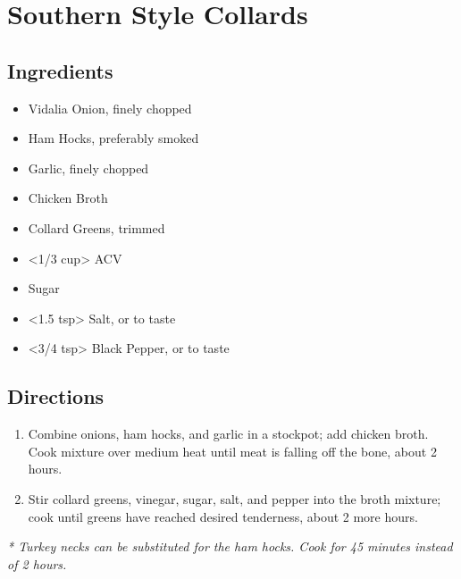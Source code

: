 \section{Southern Style Collards}

\subsection{ Ingredients }

\begin{itemize}
  \item <2 onions> Vidalia Onion, finely chopped
  \item <3 lbs> Ham Hocks, preferably smoked
  \item <4 cloves> Garlic, finely chopped
  \item <32 oz> Chicken Broth
  \item <3 lbs> Collard Greens, trimmed
  \item <1/3 cup> ACV
  \item <2 tbs> Sugar
  \item <1.5 tsp> Salt, or to taste
  \item <3/4 tsp> Black Pepper, or to taste
\end{itemize}

\subsection{ Directions }

\begin{enumerate}
  \item Combine onions, ham hocks, and garlic in a stockpot; add chicken broth. Cook mixture over medium heat until meat is falling off the bone, about 2 hours.
  \item Stir collard greens, vinegar, sugar, salt, and pepper into the broth mixture; cook until greens have reached desired tenderness, about 2 more hours.
\end{enumerate}

\textit{* Turkey necks can be substituted for the ham hocks. Cook for 45 minutes instead of 2 hours. }
